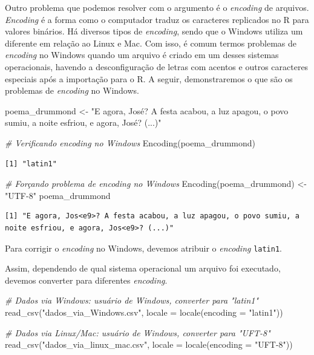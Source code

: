 \documentclass[
  brazilian,
]{book}
\newenvironment{Shaded}{\begin{snugshade}}{\end{snugshade}}
\newcommand{\AttributeTok}[1]{\textcolor[rgb]{0.77,0.63,0.00}{#1}}
\newcommand{\CommentTok}[1]{\textcolor[rgb]{0.56,0.35,0.01}{\textit{#1}}}
\newcommand{\FunctionTok}[1]{\textcolor[rgb]{0.00,0.00,0.00}{#1}}
\newcommand{\NormalTok}[1]{#1}
\newcommand{\OtherTok}[1]{\textcolor[rgb]{0.56,0.35,0.01}{#1}}
\newcommand{\StringTok}[1]{\textcolor[rgb]{0.31,0.60,0.02}{#1}}
\begin{document}
Outro problema que podemos resolver com o argumento é o \emph{encoding} de arquivos. \emph{Encoding} é a forma como o computador traduz os caracteres replicados no R para valores binários. Há diversos tipos de \emph{encoding}, sendo que o Windows utiliza um diferente em relação ao Linux e Mac. Com isso, é comum termos problemas de \emph{encoding} no Windows quando um arquivo é criado em um desses sistemas operacionais, havendo a desconfiguração de letras com acentos e outros caracteres especiais após a importação para o R. A seguir, demonstraremos o que são os problemas de \emph{encoding} no Windows.

\begin{Shaded}
\begin{Highlighting}[]
\NormalTok{poema\_drummond }\OtherTok{\textless{}{-}} \StringTok{"E agora, José? A festa acabou, a luz apagou, o povo sumiu, a noite esfriou, e agora, José? (...)"}

\CommentTok{\# Verificando encoding no Windows}
\FunctionTok{Encoding}\NormalTok{(poema\_drummond)}
\end{Highlighting}
\end{Shaded}

\begin{verbatim}
[1] "latin1"
\end{verbatim}

\begin{Shaded}
\begin{Highlighting}[]
\CommentTok{\# Forçando problema de encoding no Windows}
\FunctionTok{Encoding}\NormalTok{(poema\_drummond) }\OtherTok{\textless{}{-}} \StringTok{"UTF{-}8"}
\NormalTok{poema\_drummond}
\end{Highlighting}
\end{Shaded}

\begin{verbatim}
[1] "E agora, Jos<e9>? A festa acabou, a luz apagou, o povo sumiu, a noite esfriou, e agora, Jos<e9>? (...)"
\end{verbatim}

Para corrigir o \emph{encoding} no Windows, devemos atribuir o \emph{encoding} \texttt{latin1}.

Assim, dependendo de qual sistema operacional um arquivo foi executado, devemos converter para diferentes \emph{encoding}.

\begin{Shaded}
\begin{Highlighting}[]
\CommentTok{\# Dados via Windows: usuário de Windows, converter para "latin1"}
\FunctionTok{read\_csv}\NormalTok{(}\StringTok{"dados\_via\_Windows.csv"}\NormalTok{, }\AttributeTok{locale =} \FunctionTok{locale}\NormalTok{(}\AttributeTok{encoding =} \StringTok{"latin1"}\NormalTok{))}

\CommentTok{\# Dados via Linux/Mac: usuário de Windows, converter para "UFT{-}8"}
\FunctionTok{read\_csv}\NormalTok{(}\StringTok{"dados\_via\_linux\_mac.csv"}\NormalTok{, }\AttributeTok{locale =} \FunctionTok{locale}\NormalTok{(}\AttributeTok{encoding =} \StringTok{"UFT{-}8"}\NormalTok{))}
\end{Highlighting}
\end{Shaded}
\end{document}
